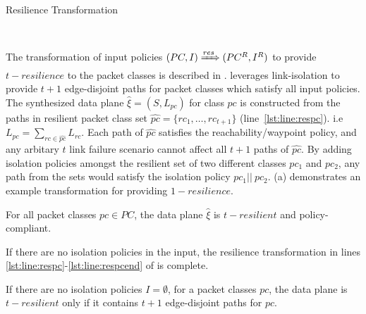 \begin{algorithm}[h]
	\begin{footnotesize}
		\caption{Resilience Transformation}
		\label{restransform}
		\begin{algorithmic}[1]
			\vspace*{0.25cm}
			 \label{lst:line:respc}
			 \label{lst:line:respcend}
			\EndFor
			 \label{lst:line:respolicy}
			\EndFor \\
		\end{algorithmic}
	\end{footnotesize}
\end{algorithm}
\noindent The transformation of input policies $(PC, I) \xRightarrow{res} (PC^R, I^R)$ to provide $t-resilience$ to the packet classes is described in . 
\name leverages link-isolation to provide $t+1$ edge-disjoint paths for packet classes which satisfy all input policies.  
The synthesized data plane $\hat{\xi} = (S, L_{pc})$ for class $pc$ is constructed from the 
paths in resilient packet class set $\hat{pc} = \{rc_1,\ldots,rc_{t+1}\}$ (line~\ref{lst:line:respc}).
i.e $L_{pc} = \sum\limits_{rc \in \hat{pc}} L_{rc}$. 
Each path of $\hat{pc}$ satisfies the reachability/waypoint policy, and any arbitary $t$ link failure scenario cannot affect all $t+1$ paths of $\hat{pc}$.
By adding isolation policies amongst the resilient set of two different classes $pc_1$ and $pc_2$, any path from the sets
would satisfy the isolation policy $pc_1 || \ pc_2$.
(a) demonstrates an example transformation for providing $1-resilience$. 

\begin{theorem}[Soundness]
	For all packet classes $pc \in PC$, the data plane $\hat{\xi}$ is $t-resilient$ 
	and policy-compliant. 
\end{theorem}
\noindent If there are no isolation policies in the input, the resilience transformation in lines 
\ref{lst:line:respc}-\ref{lst:line:respcend} of  is complete.
\begin{theorem}[Completeness]
If there are no isolation policies $I = \emptyset$, 
	for a packet classes $pc$, the data plane is $t-resilient$ only if it 
	contains $t + 1$ edge-disjoint paths for $pc$.
\end{theorem}

